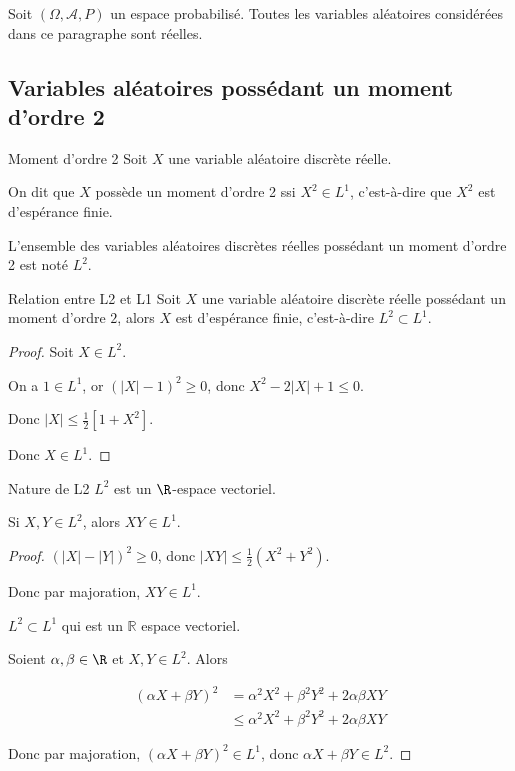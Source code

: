 Soit $(\Omega, \mathcal A, P)$ un espace probabilisé. Toutes les variables aléatoires 
considérées dans ce paragraphe sont réelles. 

\subsection{Variables aléatoires possédant un moment d'ordre 2 }

\begin{definition}{Moment d'ordre 2}{}
    Soit $X$ une variable aléatoire discrète réelle. 

    On dit que $X$ possède un moment d'ordre 2 ssi $X^2 \in L^1$, c'est-à-dire que
    $X^2$ est d'espérance finie.

    L'ensemble des variables aléatoires discrètes réelles possédant un moment d'ordre 2 
    est noté $L^2$.
\end{definition}



\begin{proposition}{Relation entre L2 et L1}{}
    Soit $X$ une variable aléatoire discrète réelle possédant un moment d'ordre $2$, 
    alors $X$ est d'espérance finie, c'est-à-dire $L^2 \subset L^1$.
\end{proposition}

\begin{proof}
    Soit $X \in L^2$. 

    On a $1 \in L^1$, or $(|X| -1 )^2 \geqslant 0$, donc 
    $X^2 - 2 |X| + 1 \leqslant 0$. 

    Donc $|X| \leqslant \frac 1 2[1 + X^2]$. 

    Donc $X \in L^1$. 
\end{proof}

\begin{proposition}{Nature de L2}{}
    $L^2$ est un $\R$-espace vectoriel. 
\end{proposition}

 Si $X, Y \in L^2$, alors $XY \in L^1$.


\begin{proof}
    $(|X| - |Y|)^2 \geqslant 0$, donc $|XY| \leqslant \frac 1 2 (X^2 + Y^2)$.

    Donc par majoration, $XY \in L^1$.

    $L^2 \subset L^1$ qui est un $\mathbb R$ espace vectoriel. 

    Soient $\alpha, \beta \in \R$ et $X, Y \in L^2$. Alors 

    \begin{align}
        (\alpha X + \beta Y)^2 & = \alpha^2 X^2 + \beta^2 Y^2 + 2 \alpha \beta XY \\
        & \leqslant \alpha^2 X^2 + \beta^2 Y^2 + 2 \alpha \beta XY
    \end{align}

    Donc par majoration, $(\alpha X + \beta Y)^2 \in L^1$, donc $\alpha X + \beta Y \in L^2$.
\end{proof}

